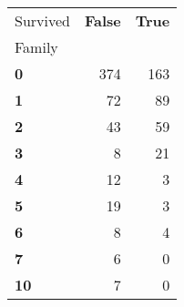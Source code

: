 \begin{tabular}{lrr}
\toprule
Survived & \textbf{False} & \textbf{True} \\
Family &  &  \\
\midrule
\textbf{0} & 374 & 163 \\
\textbf{1} & 72 & 89 \\
\textbf{2} & 43 & 59 \\
\textbf{3} & 8 & 21 \\
\textbf{4} & 12 & 3 \\
\textbf{5} & 19 & 3 \\
\textbf{6} & 8 & 4 \\
\textbf{7} & 6 & 0 \\
\textbf{10} & 7 & 0 \\
\bottomrule
\end{tabular}
